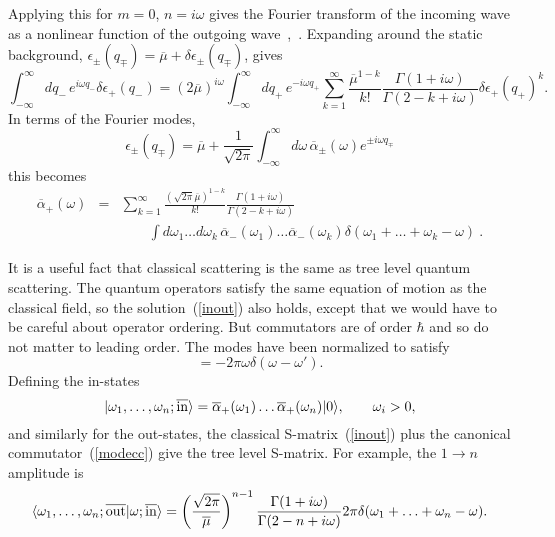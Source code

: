 Applying this for $m = 0$, $n = i\omega$ gives the
Fourier transform of the incoming wave as a nonlinear function of the
outgoing wave~\cite{MPless},~\cite{Pcon}.  Expanding around the static
background, $\epsilon_{\pm}(q_\mp) = \overline\mu +
\delta\epsilon_{\pm}(q_\mp)$, gives
\begin{equation}
\int_{-\infty}^\infty dq_-\, e^{i \omega q_-}\delta\epsilon_{+}(q_-)
= (2\overline\mu)^{i \omega} \int_{-\infty}^\infty dq_+\, e^{-i
\omega q_+}
\sum_{k=1}^\infty \frac{\overline\mu^{1-k}}{k!}
\frac{\Gamma(1+i\omega)}{\Gamma(2 - k + i\omega)}
\delta\epsilon_{+}(q_+)^k.
\end{equation}
In terms of the Fourier modes,
\begin{equation}
\epsilon_{\pm}(q_{\mp}) = \overline\mu + \frac{1}{\sqrt{2\pi}}
\int_{-\infty}^{\infty} d\omega\, 
\overline\alpha_{\pm}(\omega) e^{\pm i
\omega q_\mp} 
\end{equation}
this becomes 
\begin{eqnarray}
\overline\alpha_{+}(\omega) &=& \sum_{k = 1}^\infty
\frac{(\sqrt{2\pi}\overline\mu)^{1-k}}{k!}
\frac{\Gamma(1+i\omega)}{\Gamma(2 - k + i\omega)} \label{inout}\\
&&\qquad \int d\omega_1 \ldots d\omega_k\,
\overline\alpha_{-}(\omega_1)
\ldots \overline\alpha_{-}(\omega_k)
\delta(\omega_1 + \ldots + \omega_k - \omega)\ .
\nonumber
\end{eqnarray}

It is a useful fact that classical scattering is the same as tree level
quantum scattering.  The quantum operators satisfy the same equation of
motion as the classical field, so the solution~(\ref{inout}) also
holds, except that we would have to be careful about operator ordering.
But commutators are of order $\hbar$ and so do not matter to leading
order.
The modes have been normalized to satisfy
\begin{equation}
[ \overline\alpha_{\pm}(\omega), 
\overline\alpha_{\pm}(\omega')]
= -2\pi\omega \delta(\omega - \omega'). \label{modecc}
\end{equation}
Defining the in-states
\begin{equation}
| \omega_1, \ldots, \omega_n; \overline{\rm in} \rangle
= \overline\alpha_{+}(\omega_1) \ldots
\overline\alpha_{+}(\omega_n) |0\rangle, \qquad \omega_i > 0,
\end{equation}
and similarly for the out-states, the classical S-matrix~(\ref{inout})
plus the canonical commutator~(\ref{modecc}) give the tree level
S-matrix.  For example, the $1 \to n$ amplitude is~\cite{MPless}
\begin{equation}
\langle \omega_1, \ldots, \omega_n; 
\overline{\rm out}| \omega; \overline{\rm in} \rangle
= \left( \frac{\sqrt{2\pi}}{\overline\mu} \right)^{n-1}
\frac{\Gamma(1+i\omega)}{\Gamma(2 - n + i\omega)}
2\pi \delta(\omega_1 + \ldots + \omega_n - \omega).  \label{sbar}
\end{equation}

